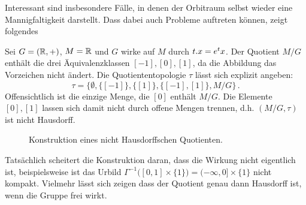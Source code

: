%
%
%
%
Interessant sind insbesondere Fälle, in denen der Orbitraum selbst wieder eine
Mannigfaltigkeit darstellt. Dass dabei auch Probleme auftreten können, zeigt
folgendes 
\begin{beispiel} Sei $G=(\mathbb{R},+)$, $M=\mathbb{R}$ und $G$ wirke auf
$M$ durch $t . x=e^tx$.
Der Quotient $M/G$ enthält die drei Äquivalenzklassen $[-1],[0],[1]$, da die
Abbildung das Vorzeichen nicht ändert.
Die Quotiententopologie $\tau$ lässt sich explizit angeben:
\begin{equation}
\tau =\big\{\emptyset,\{[-1]\},\{[1]\},\{[-1],[1]\},M/G\big\}\,.
\end{equation}
Offensichtlich ist die einzige Menge, die $[0]$ enthält $M/G$. Die Elemente
$[0],[1]$ lassen sich damit nicht durch offene Mengen trennen, d.h. $(M/G,\tau)$
ist nicht Hausdorff.
\begin{figure}[!htbp]
\centering
{}
\caption{Konstruktion eines nicht Hausdorffschen Quotienten.}
\end{figure}
\end{beispiel}
Tatsächlich scheitert die Konstruktion daran, dass die Wirkung nicht eigentlich
ist, beispielsweise ist das Urbild $\Gamma^{-1}\big([0,1]\times
\{1\}\big)=(-\infty,0]\times \{1\}$ nicht kompakt.
Vielmehr lässt sich zeigen dass der Quotient genau dann Hausdorff ist, wenn die
Gruppe frei wirkt.

